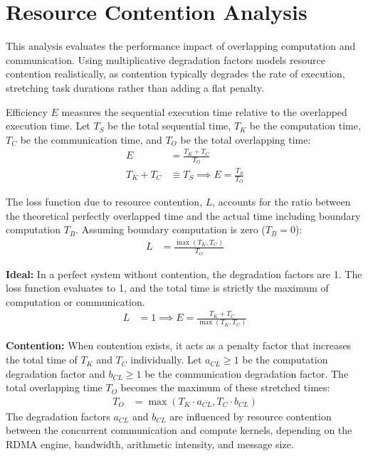 \documentclass[twocolumn, secnumarabic, amssymb, nobibnotes, aps, prd, amsmath, nofootinbib]{revtex4-2}
\begin{document}
\section{Resource Contention Analysis}

This analysis evaluates the performance impact of overlapping computation and communication. Using multiplicative degradation factors models resource contention realistically, as contention typically degrades the rate of execution, stretching task durations rather than adding a flat penalty.


Efficiency $E$ measures the sequential execution time relative to the overlapped execution time. Let $T_S$ be the total sequential time, $T_K$ be the computation time, $T_C$ be the communication time, and $T_O$ be the total overlapping time:
\begin{align*}
    E &= \frac{T_K + T_C}{T_O} \\
    T_K + T_C &\equiv T_S \implies E = \frac{T_S}{T_O}
\end{align*}

The loss function due to resource contention, $L$, accounts for the ratio between the theoretical perfectly overlapped time and the actual time including boundary computation $T_B$. Assuming boundary computation is zero ($T_{B} = 0$):
\begin{align*}
    L &= \frac{\max(T_K, T_C)}{T_O}
\end{align*}


\textbf{Ideal:} In a perfect system without contention, the degradation factors are 1. The loss function evaluates to 1, and the total time is strictly the maximum of computation or communication.
\begin{align*}
    L &= 1 \implies E = \frac{T_K + T_C}{\max(T_K, T_C)}
\end{align*}

\textbf{Contention:} When contention exists, it acts as a penalty factor that increases the total time of $T_K$ and $T_C$ individually. Let $a_{CL} \geq 1$ be the computation degradation factor and $b_{CL} \geq 1$ be the communication degradation factor. The total overlapping time $T_O$ becomes the maximum of these stretched times:
\begin{align*}
    T_O &= \max(T_K \cdot a_{CL}, T_C \cdot b_{CL})
\end{align*}
The degradation factors $a_{CL}$ and $b_{CL}$ are influenced by resource contention between the concurrent communication and compute kernels, depending on the RDMA engine, bandwidth, arithmetic intensity, and message size.
\end{document}
